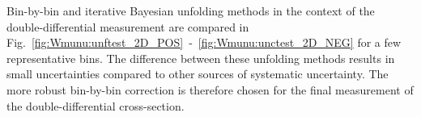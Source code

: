 Bin-by-bin and iterative Bayesian unfolding methods in the context of the double-differential measurement are compared in Fig.~\ref{fig:Wmunu:unftest_2D_POS}~-~\ref{fig:Wmunu:unctest_2D_NEG} for a few representative bins. The difference between these unfolding methods results in small uncertainties compared to other sources of systematic uncertainty. The more robust bin-by-bin correction is therefore chosen for the final measurement of the double-differential cross-section.


